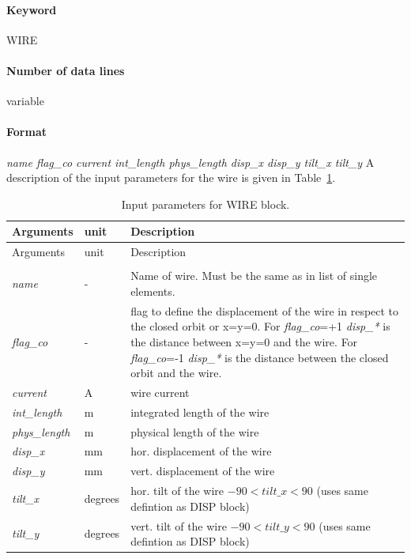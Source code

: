 \paragraph{Keyword} WIRE

\paragraph{Number of data lines} variable

\paragraph{Format} \emph{name flag\_co current int\_length phys\_length disp\_x disp\_y tilt\_x tilt\_y}
A description of the input parameters for the wire is given in Table~\ref{tab:wire}.
\begin{center}
	\begin{longtable}{|p{2.0cm} p{1.0cm} p{9.2cm}|}
		\caption{Input parameters for WIRE block.}
		\label{tab:wire} \\*
		\hline
		\rowcolor{blue!30}
		Arguments & unit & Description \\*
		\hline
		\endfirsthead
		
		\hline
		\rowcolor{blue!30}
		Arguments & unit & Description \\*
		\endhead
		
		\rowcolor{gray!15}
		\multicolumn{3}{|c|}{(The table continues on the next page)}\\*
		\hline
		\endfoot
		
		\hline
		\endlastfoot
		
		\hline
		
		\emph{name} & - &
		Name of wire. Must be the same as in list of single elements.\\*
		
		\emph{flag\_co} & - &
		flag to define the displacement of the wire in respect to the closed orbit or x=y=0. For \emph{flag\_co}=+1 \emph{disp\_*} is the distance between x=y=0 and the wire. For \emph{flag\_co}=-1 \emph{disp\_*} is the distance between the closed orbit and the wire.\\*
		\emph{current} & A &
		wire current \\*
		\emph{int\_length} & m &
		integrated length of the wire\\*
		\emph{phys\_length} & m &
		physical length of the wire\\*
		\emph{disp\_x} & mm &
		hor. displacement of the wire\\*
		\emph{disp\_y} & mm &
		vert. displacement of the wire\\*
		\emph{tilt\_x} & degrees &
		hor. tilt of the wire $-90 < tilt\_x < 90$ (uses same defintion as DISP block) \\*
		\emph{tilt\_y} & degrees &
		vert. tilt of the wire $-90 < tilt\_y < 90$ (uses same defintion as DISP block) \\*
		\hline		
	\end{longtable}
\end{center}

